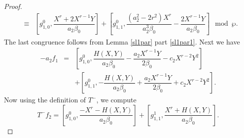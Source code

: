 \documentclass[11pt, reqno]{amsart}
\numberwithin{equation}{section}
\theoremstyle{definition}
\theoremstyle{remark}
\theoremstyle{definition}
\theoremstyle{remark}
\theoremstyle{remark}
\begin{document}
\begin{proof}
\begin{eqnarray}
   &\equiv& \left[g_{1,0}^{0},\dfrac{X^{r}+ 2X^{r-1}Y}{a_{2}\beta_{0}}\right]+ \left[g_{1,1}^{0}, \dfrac{(a_{2}^2-2r^2)X^{r}}{a_{2}^3\beta_{0}} - \dfrac{2X^{r-1}Y}{a_{2}\beta_{0}}   \right]   \mod \wp.
    \end{eqnarray}
The last congruence follows from Lemma \ref{sl1par} part \eqref{sl1par1}. 
Next we have
\begin{eqnarray}\label{F2'a2f1}
    -a_{2}f_{1} &=& \left[g_{1,0}^{0}, \dfrac{H(X,Y)}{a_{2}\beta_{0}}-\dfrac{a_{2}X^{r-1}Y}{2\beta_{0}} -c_{2}X^{r-2}Y^{2}\right] \nonumber\\
    &&+ \left[g_{1,1}^{0},-\dfrac{H(X,Y)}{a_{2}\beta_{0}}+\dfrac{a_{2}X^{r-1}Y}{2\beta_{0}} +c_{2}X^{r-2}Y^{2}\right]. 
\end{eqnarray}
Now using the definition of $T^-$, we compute
\begin{equation}\label{F2'T-f2}
    T^{-}f_{2} = \left[g_{1,0}^{0}, \dfrac{-X^{r}-H(X,Y)}{a_{2}\beta_{0}}\right] + \left[g_{1,1}^{1}, \dfrac{X^{r}+H(X,Y)}{a_{2}\beta_{0}}\right].
\end{equation}


\end{proof}
\end{document}
